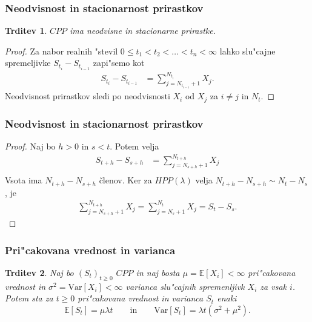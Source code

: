 \documentclass[]{beamer} %
\theoremstyle{plain}
\newtheorem{trditev}{Trditev}
\newcommand{\E}{\mathbb{E}}
\newcommand{\1}{\mathds{1}}
\newcommand{\Var}[1]{\text{Var}\left[#1\right]}
\begin{document}
\begin{frame}
    \frametitle{Neodvisnost in stacionarnost prirastkov}
    \begin{trditev}
        $CPP$ ima neodvisne in stacionarne prirastke.
        \label{trd:neodvPrirCPP}
    \end{trditev}
    \pause
    \begin{proof}
        Za nabor realnih "stevil $0 \leq t_1 < t_2 < \ldots < t_n < \infty$ lahko slu"cajne
        spremeljivke $S_{t_i} - S_{t_{i-1}}$ zapi"semo kot
        \begin{align*}
            S_{t_i} - S_{t_{i-1}} &= \sum_{j=N_{t_{i-1}}+1}^{N_{t_i}} X_j. 
        \end{align*}
        Neodvisnost prirastkov sledi po neodvisnosti $X_i$ od $X_j$ za $i\neq j$ in $N_t$. 
    \end{proof}
\end{frame}

\begin{frame}
    \frametitle{Neodvisnost in stacionarnost prirastkov}
    \begin{proof}
        Naj bo $h > 0$ in $s < t$. Potem velja
        \begin{align*}
            S_{t+h} - S_{s+h} &= \sum_{j=N_{s+h}+1}^{N_{t+h}} X_j \\
        \end{align*}
        Vsota ima $N_{t+h} - N_{s+h}$ členov. Ker za $HPP(\lambda)$ velja 
        $N_{t+h} - N_{s+h} \sim N_t - N_s$, je 
        \begin{align*}
            \sum_{j=N_{s+h}+1}^{N_{t+h}} X_j = \sum_{j=N_{s}+1}^{N_{t}} X_j = S_t - S_s.
        \end{align*}
    \end{proof}
\end{frame}



\begin{frame}
    \frametitle{Pri"cakovana vrednost in varianca}
    \begin{trditev}
        Naj bo $(S_t)_{t\geq 0}$ $CPP$ in naj bosta $\mu = \E\left[X_i\right] < \infty$ 
        pri"cakovana vrednost in $\sigma^2= \Var{X_i} <\infty$ varianca
        slu"cajnih spremenljivk $X_i$ za vsak $i$. Potem sta za $t\geq0$ pri"cakovana vrednost in 
        varianca $S_t$ enaki 
        \begin{equation*}
            \E\left[S_t\right] = \mu\lambda t \qquad \text{in} \qquad \Var{S_t} = \lambda t\left(\sigma^2 + \mu^2\right).
        \end{equation*}
        \label{trd:PricVarCPP}
    \end{trditev}
\end{frame}
\end{document}

